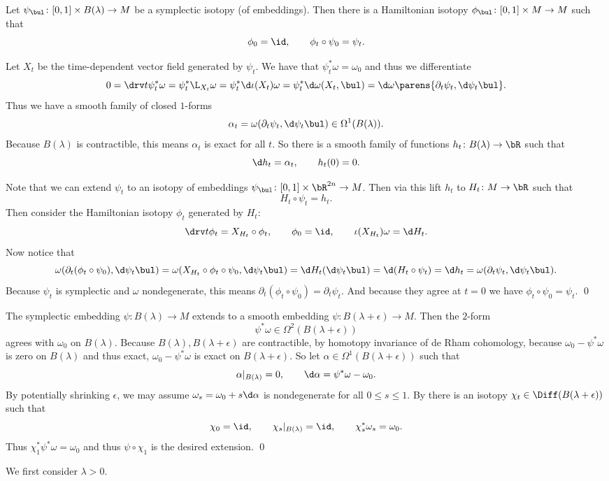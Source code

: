     Let $\psi_\bul\colon[0,1]\times B(\lambda)\to M$ be a symplectic isotopy (of embeddings).
    Then there is a Hamiltonian isotopy $\phi_\bul\colon[0,1]\times M\to M$ such that
    $$ \phi_0 = \id,\qquad \phi_t\circ\psi_0 = \psi_t . $$

\elemm

\bproof

    Let $X_t$ be the time-dependent vector field generated by $\psi_t$.
    We have that $\psi_t^*\omega=\omega_0$ and thus we differentiate
    $$ 0 = \drv t\psi_t^*\omega = \psi_t^*\L_{X_t}\omega = \psi_t^*\d\iota(X_t)\omega = \psi_t^*\d\omega(X_t,\bul)
    = \d\omega\parens{\partial_t\psi_t,\d\psi_t\bul} . $$
    Thus we have a smooth family of closed $1$-forms
    $$ \alpha_t = \omega(\partial_t\psi_t,\d\psi_t\bul) \in \Omega^1(B(\lambda)) . $$
    Because $B(\lambda)$ is contractible, this means $\alpha_t$ is exact for all $t$.
    So there is a smooth family of functions $h_t\colon B(\lambda)\to\bR$ such that
    $$ \d h_t = \alpha_t,\qquad h_t(0) = 0 . $$

    Note that we can extend $\psi_t$ to an isotopy of embeddings $\psi_\bul\colon[0,1]\times\bR^{2n}\to M$.
    Then via this lift $h_t$ to $H_t\colon M\to\bR$ such that
    $$ H_t\circ\psi_t = h_t . $$
    Then consider the Hamiltonian isotopy $\phi_t$ generated by $H_t$:
    $$ \drv t\phi_t = X_{H_t}\circ\phi_t,\qquad \phi_0 = \id,\qquad \iota(X_{H_t})\omega = \d H_t . $$
    Now notice that
    $$ \omega(\partial_t(\phi_t\circ\psi_0),\d\psi_t\bul) = \omega(X_{H_t}\circ\phi_t\circ\psi_0,\d\psi_t\bul) = \d H_t(\d\psi_t\bul) = \d(H_t\circ\psi_t) = \d h_t
    = \omega(\partial_t\psi_t,\d\psi_t\bul) . $$
    Because $\psi_t$ is symplectic and $\omega$ nondegenerate, this means $\partial_t(\phi_t\circ\psi_0)=\partial_t\psi_t$.
    And because they agree at $t=0$ we have $\phi_t\circ\psi_0=\psi_t$.
    \qed

\eproof


    The symplectic embedding $\psi\colon B(\lambda)\to M$ extends to a smooth embedding $\psi\colon B(\lambda+\epsilon)\to M$.
    Then the $2$-form
    $$ \psi^*\omega \in \Omega^2(B(\lambda+\epsilon)) $$
    agrees with $\omega_0$ on $B(\lambda)$.
    Because $B(\lambda),B(\lambda+\epsilon)$ are contractible, by homotopy invariance of de Rham cohomology, because $\omega_0-\psi^*\omega$ is zero on $B(\lambda)$
    and thus exact, $\omega_0-\psi^*\omega$ is exact on $B(\lambda+\epsilon)$.
    So let $\alpha\in\Omega^1(B(\lambda+\epsilon))$ such that
    $$ \alpha|_{B(\lambda)} = 0,\qquad \d\alpha = \psi^*\omega - \omega_0 . $$
    By potentially shrinking $\epsilon$, we may assume $\omega_s=\omega_0+s\d\alpha$ is nondegenerate for all $0\leq s\leq1$.
    By  there is an isotopy $\chi_t\in\Diff(B(\lambda+\epsilon))$ such that
    $$ \chi_0 = \id,\qquad \chi_s|_{B(\lambda)} = \id,\qquad \chi_s^*\omega_s = \omega_0 . $$
    Thus $\chi_1^*\psi^*\omega=\omega_0$ and thus $\psi\circ\chi_1$ is the desired extension.
    \qed

\eproof


    We first consider $\lambda>0$.

\eproof


